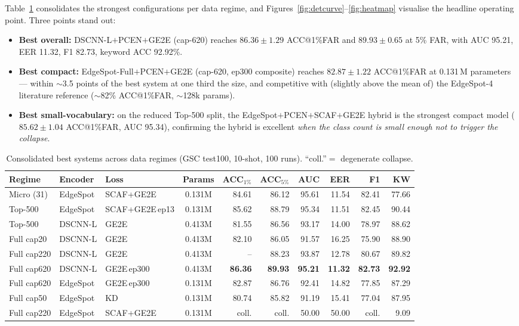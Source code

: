 \documentclass[12pt,a4paper]{article}
\begin{document}
Table~\ref{tab:final} consolidates the strongest configurations per data regime,
and Figures~\ref{fig:detcurve}--\ref{fig:heatmap} visualise the headline operating
point. Three points stand out:
\begin{itemize}[leftmargin=1.3em,itemsep=2pt]
\item \textbf{Best overall:} DSCNN-L$+$PCEN$+$GE2E (cap-620) reaches
$\mathbf{86.36\pm1.29}$ ACC@1\%FAR and $89.93\pm0.65$ at 5\% FAR, with AUC 95.21,
EER 11.32, F1 82.73, keyword ACC 92.92\%.
\item \textbf{Best compact:} EdgeSpot-Full$+$PCEN$+$GE2E (cap-620, ep300
composite) reaches $\mathbf{82.87\pm1.22}$ ACC@1\%FAR at 0.131\,M parameters ---
within $\sim$3.5 points of the best system at one third the size, and competitive
with (slightly above the mean of) the EdgeSpot-4 literature reference
($\sim$82\% ACC@1\%FAR, $\sim$128k params).
\item \textbf{Best small-vocabulary:} on the reduced Top-500 split, the
EdgeSpot$+$PCEN$+$SCAF$+$GE2E hybrid is the strongest compact model
($85.62\pm1.04$ ACC@1\%FAR, AUC 95.34), confirming the hybrid is excellent
\emph{when the class count is small enough not to trigger the collapse}.
\end{itemize}

\begin{table}[t]
\centering
\caption{Consolidated best systems across data regimes (GSC test100, 10-shot, 100
runs). ``coll.''$=$ degenerate collapse.}
\label{tab:final}
\small
\setlength{\tabcolsep}{4pt}
\begin{tabular}{l l l c r r r r r r}
\toprule
\textbf{Regime} & \textbf{Encoder} & \textbf{Loss} & \textbf{Params} &
ACC$_{1\%}$ & ACC$_{5\%}$ & AUC & EER & F1 & KW\\
\midrule
Micro (31)    & EdgeSpot & SCAF+GE2E      & 0.131M & 84.61 & 86.12 & 95.61 & 11.54 & 82.41 & 77.66 \\
Top-500       & EdgeSpot & SCAF+GE2E\,ep13& 0.131M & 85.62 & 88.79 & 95.34 & 11.51 & 82.45 & 90.44 \\
Top-500       & DSCNN-L  & GE2E           & 0.413M & 81.55 & 86.56 & 93.17 & 14.00 & 78.97 & 88.62 \\
Full cap20    & DSCNN-L  & GE2E           & 0.413M & 82.10 & 86.05 & 91.57 & 16.25 & 75.90 & 88.90 \\
Full cap220   & DSCNN-L  & GE2E           & 0.413M & --    & 88.23 & 93.87 & 12.78 & 80.67 & 89.82 \\
\rowcolor{blue!7}
Full cap620   & DSCNN-L  & GE2E\,ep300    & 0.413M & \textbf{86.36} & \textbf{89.93} & \textbf{95.21} & \textbf{11.32} & \textbf{82.73} & \textbf{92.92} \\
Full cap620   & EdgeSpot & GE2E\,ep300    & 0.131M & 82.87 & 86.76 & 92.41 & 14.82 & 77.85 & 87.29 \\
Full cap50    & EdgeSpot & KD             & 0.131M & 80.74 & 85.82 & 91.19 & 15.41 & 77.04 & 87.95 \\
Full cap220   & EdgeSpot & SCAF+GE2E      & 0.131M & coll. & coll. & 50.00 & 50.00 & coll. & 9.09 \\
\bottomrule
\end{tabular}
\end{table}
\end{document}
